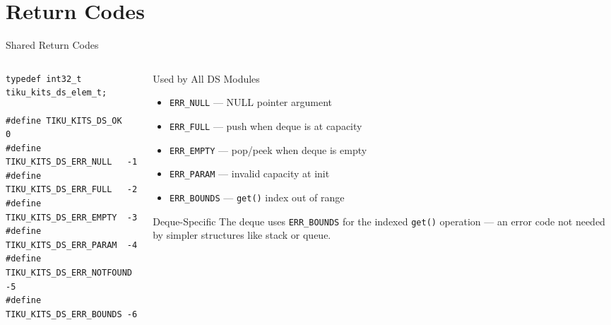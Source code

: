 \documentclass[aspectratio=169, 10pt]{beamer}
\begin{document}
\section{Return Codes}

\begin{frame}[fragile]{Shared Return Codes}
\begin{columns}[T]
\begin{column}{0.48\textwidth}
\begin{lstlisting}[style=cstyle,
  title={ds/tiku\_kits\_ds.h (shared)}]
typedef int32_t tiku_kits_ds_elem_t;

#define TIKU_KITS_DS_OK          0
#define TIKU_KITS_DS_ERR_NULL   -1
#define TIKU_KITS_DS_ERR_FULL   -2
#define TIKU_KITS_DS_ERR_EMPTY  -3
#define TIKU_KITS_DS_ERR_PARAM  -4
#define TIKU_KITS_DS_ERR_NOTFOUND -5
#define TIKU_KITS_DS_ERR_BOUNDS -6
\end{lstlisting}
\end{column}

\begin{column}{0.48\textwidth}
\begin{block}{Used by All DS Modules}
\begin{itemize}
  \item \texttt{ERR\_NULL} --- NULL pointer argument
  \item \texttt{ERR\_FULL} --- push when deque is at capacity
  \item \texttt{ERR\_EMPTY} --- pop/peek when deque is empty
  \item \texttt{ERR\_PARAM} --- invalid capacity at init
  \item \texttt{ERR\_BOUNDS} --- \texttt{get()} index out of range
\end{itemize}
\end{block}

\vspace{0.3em}
\begin{alertblock}{Deque-Specific}
The deque uses \texttt{ERR\_BOUNDS} for the indexed
\texttt{get()} operation --- an error code not needed by
simpler structures like stack or queue.
\end{alertblock}
\end{column}
\end{columns}
\end{frame}

\end{document}
